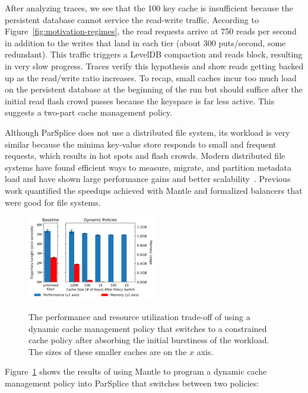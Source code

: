 After analyzing traces, we see that the 100 key cache is insufficient because
the persistent database cannot service the read-write traffic.  According to
Figure~\ref{fig:motivation-regimes}, the read requests arrive at 750 reads per
second in addition to the writes that land in each tier (about 300 puts/second,
some redundant). This traffic triggers a LevelDB compaction and reads block,
resulting in very slow progress.  Traces verify this hypothesis and show reads
getting backed up as the read/write ratio increases. To recap, small caches
incur too much load on the persistent database  at the beginning of the run but
should suffice after the initial read flash crowd passes because
the keyspace is far less active. This suggests a two-part cache management
policy.

Although ParSplice does not use a distributed file system, its workload is very
similar because the minima key-value store responds to small and frequent
requests, which results in hot spots and flash crowds.  Modern distributed file
systems have found efficient ways to measure, migrate, and partition metadata
load and have shown large performance gains and
better scalability~\cite{zheng:pdsw2014-batchfs, zheng:pdsw2015-deltafs,
grider:pdsw2015-marfs, ren:sc2014-indexfs, patil:fast2011-giga+,
brandt:msst2003-lh}.  Previous work quantified the speedups achieved with
Mantle and formalized balancers that were good for file systems.

\begin{figure}[t]
  \noindent\includegraphics[width=0.5\textwidth]{figures/methodology-tradeoff-dynamic.png}\\
  \caption{The performance and resource utilization trade-off of using a
  dynamic cache management policy that switches to a constrained cache policy after absorbing
  the initial burstiness of the workload. The sizes of these smaller caches are
  on the \(x\) axis.  \label{fig:methodology-tradeoff-dynamic}}
\end{figure}

Figure~\ref{fig:methodology-tradeoff-dynamic} shows the results of using Mantle
to program a dynamic cache management policy into ParSplice that switches between
two policies:

